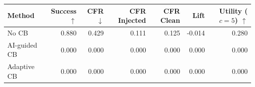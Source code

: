 \begin{tabular}{lrrrrrr}
\toprule
Method & Success $\uparrow$ & CFR $\downarrow$ & CFR Injected & CFR Clean & Lift & Utility ($c=5$) $\uparrow$ \\
\midrule
No CB & 0.880 & 0.429 & 0.111 & 0.125 & -0.014 & 0.280 \\
AI-guided CB & 0.000 & 0.000 & 0.000 & 0.000 & 0.000 & 0.000 \\
Adaptive CB & 0.000 & 0.000 & 0.000 & 0.000 & 0.000 & 0.000 \\
\bottomrule
\end{tabular}

